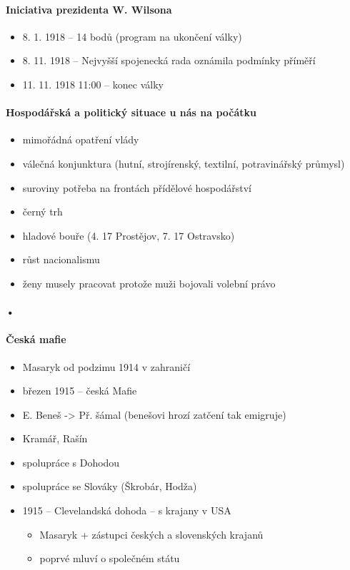 \paragraph{Iniciativa prezidenta W. Wilsona}
\begin{itemize}
\item 8. 1. 1918 -- 14 bodů (program na ukončení války)
\item 8. 11. 1918 -- Nejvyšší spojenecká rada oznámila podmínky příměří
\item 11. 11. 1918 11:00 -- konec války
\end{itemize}


\paragraph{Hospodářská a politický situace u nás na počátku}
\begin{itemize}
\item mimořádná opatření vlády
\item válečná konjunktura (hutní, strojírenský, textilní, potravinářský průmysl)
\item suroviny potřeba na frontách \ra přídělové hospodářství
\item černý trh
\item hladové bouře (4. 17 Prostějov, 7. 17 Ostravsko)
\item růst nacionalismu
\item ženy musely pracovat protože muži bojovali \ra volební právo
\end{itemize}

\paragraph{•}

\paragraph{Česká mafie}
\begin{itemize}
\item Masaryk od podzimu 1914 v zahraničí
\item březen 1915 -- česká Mafie
\item E. Beneš -> Př. šámal (benešovi hrozí zatčení tak emigruje)
\item Kramář, Rašín
\item spolupráce s Dohodou
\item spolupráce se Slováky (Škrobár, Hodža)
\item 1915 -- Clevelandská dohoda -- s krajany v USA
	\begin{itemize}
	\item Masaryk + zástupci českých a slovenských krajanů
	\item poprvé mluví o společném státu 
	\end{itemize}
\end{itemize}


